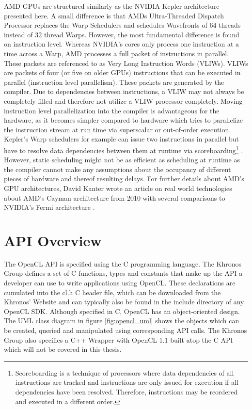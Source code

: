 AMD GPUs are structured similarly as the NVIDIA Kepler architecture presented here. A small difference is that AMDs Ultra-Threaded Dispatch Processor replaces the Warp Schedulers and schedules Wavefronts of 64 threads instead of 32 thread Warps. However, the most fundamental difference is found on instruction level. Whereas NVIDIA's cores only process one instruction at a time across a Warp, AMD processes a full packet of instructions in parallel. These packets are referenced to as Very Long Instruction Words (VLIWs). VLIWs are packets of four (or five on older GPUs) instructions that can be executed in parallel (instruction level parallelism). These packets are generated by the compiler. Due to dependencies between instructions, a VLIW may not always be completely filled and therefore not utilize a VLIW processor completely. Moving instruction level parallelization into the compiler is advantageous for the hardware, as it becomes simpler compared to hardware which tries to parallelize the instruction stream at run time via superscalar or out-of-order execution. Kepler's Warp schedulers for example can issue two instructions in parallel but have to resolve data dependencies between them at runtime via scoreboarding\footnote{Scoreboarding is a technique of processors where data dependencies of all instructions are tracked and instructions are only issued for execution if all dependencies have been resolved. Therefore, instructions may be reordered and executed in a different order.} \cite[p.4]{cayman_arch}. However, static scheduling might not be as efficient as scheduling at runtime as the compiler cannot make any assumptions about the occupancy of different pieces of hardware and thereof resulting delays. For further details about AMD's GPU architectures, David Kanter wrote an article on real world technologies about AMD's Cayman architecture from 2010 with several comparisons to NVIDIA's Fermi architecture \cite{cayman_arch}.

\section{API Overview}

The OpenCL API is specified using the C programming language. The Khronos Group defines a set of C functions, types and constants that make up the API a developer can use to write applications using OpenCL. These declarations are cumulated into the cl.h C header file, which can be downloaded from the Khronos' Website and can typically also be found in the include directory of any OpenCL SDK. Although specified in C, OpenCL has an object-oriented design. The UML class diagram in figure \ref{fig:opencl_uml} shows the objects which can be created, queried and manipulated using corresponding API calls. The Khronos Group also specifies a C++ Wrapper with OpenCL 1.1 built atop the C API which will not be covered in this thesis.


